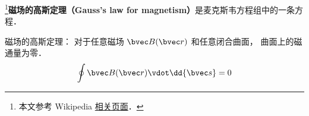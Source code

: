 
\begin{issues}
\issueDraft
\end{issues}


\footnote{本文参考 Wikipedia \href{https://en.wikipedia.org/wiki/Gauss's_law_for_magnetism}{相关页面}．}\textbf{磁场的高斯定理（Gauss's law for magnetism）}是麦克斯韦方程组中的一条方程．

磁场的高斯定理： 对于任意磁场 $\bvec B(\bvec r)$ 和任意闭合曲面， 曲面上的磁通量为零．
\begin{equation}
\oint \bvec B(\bvec r) \vdot \dd{\bvec s} = 0
\end{equation}
